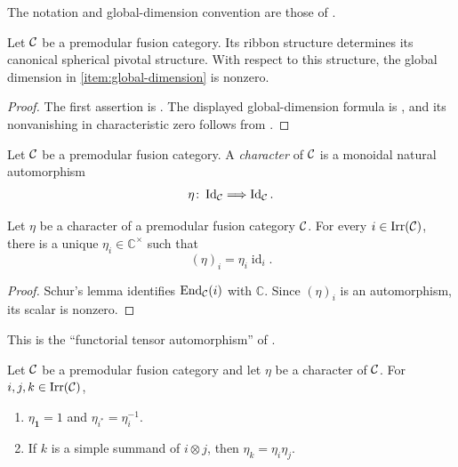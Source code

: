 \begin{remark}
\label{rem:global-dimension-reference}
The notation and global-dimension convention are those of
\cite[Sections~4.1 and~8.13, especially Equation~(8.53)]{EGNO2015}.
\end{remark}

\begin{proposition}
\label{prop:canonical-spherical-dimension}
Let \(\mathcal{C}\) be a premodular fusion category.  Its ribbon structure determines
its canonical spherical pivotal
structure.  With respect to this structure, the global dimension in
\cref{item:global-dimension} is nonzero.
\end{proposition}

\begin{proof}
The first assertion is \cite[Proposition~8.10.12]{EGNO2015}.  The displayed
global-dimension formula is \cite[Equation~(8.53)]{EGNO2015}, and its
nonvanishing in characteristic zero follows from
\cite[Theorem~7.21.12]{EGNO2015}.
\end{proof}

\begin{definition}[Character]
\label{def:character}
Let \(\mathcal{C}\) be a premodular fusion category.  A \emph{character} of \(\mathcal{C}\)
is a monoidal natural automorphism
\[
  \eta\colon\operatorname{Id}_{\mathcal{C}}\Longrightarrow
  \operatorname{Id}_{\mathcal{C}}.
\]
\end{definition}

\begin{lemma}
\label{lem:simple-object-character-scalars}
Let \(\eta\) be a character of a premodular fusion category \(\mathcal{C}\).  For
every \(i\in\operatorname{Irr}(\mathcal{C})\), there is a unique
\(\eta_i\in\mathbb C^\times\) such that
\[
  (\eta)_i=\eta_i\operatorname{id}_i.
\]
\end{lemma}

\begin{proof}
Schur's lemma identifies \(\operatorname{End}_{\mathcal{C}}(i)\) with
\(\mathbb C\).  Since \((\eta)_i\) is an automorphism, its scalar is
nonzero.
\end{proof}

\begin{remark}
\label{rem:yetter-character-terminology}
This is the ``functorial tensor automorphism'' of
\cite[Definition~1]{Yetter1993}.
\end{remark}

\begin{lemma}
\label{lem:character-identities}
Let \(\mathcal{C}\) be a premodular fusion category and let \(\eta\) be a character
of \(\mathcal{C}\).  For $i,j,k\in\operatorname{Irr}(\mathcal{C})$,
\begin{enumerate}[label=(\roman*),ref=\roman*]
  \item\label{item:character-unit-dual}
  $\eta_{\mathbf 1}=1$ and $\eta_{i^*}=\eta_i^{-1}$.

  \item\label{item:character-fusion}
  If $k$ is a simple summand of $i\otimes j$, then
  $\eta_k=\eta_i\eta_j$.
\end{enumerate}
\end{lemma}

